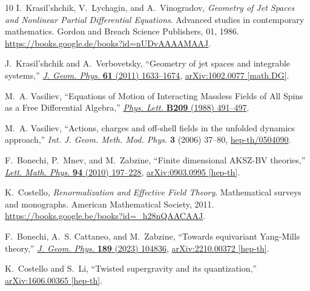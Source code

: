 \documentclass[a4paper,12pt]{article}
\numberwithin{equation}{section} %
\numberwithin{equation}{section}
\begin{document}
\begin{thebibliography}{10}
I.~Krasil'shchik, V.~Lychagin, and A.~Vinogradov, {\em Geometry of Jet Spaces and Nonlinear Partial Differential Equations}.
\newblock Advanced studies in contemporary mathematics. Gordon and Breach Science Publishers, 01, 1986.
\newblock \url{https://books.google.de/books?id=nUDvAAAAMAAJ}.

J.~Krasil'shchik and A.~Verbovetsky, ``{G}eometry of jet spaces and integrable systems,'' \href{http://dx.doi.org/10.1016/j.geomphys.2010.10.012}{{\em J. Geom. Phys.} {\bfseries 61} (2011) 1633--1674},
\href{http://arxiv.org/abs/1002.0077}{{\ttfamily arXiv:1002.0077 [math.DG]}}.

M.~A. Vasiliev, ``{Equations of Motion of Interacting Massless Fields of All Spins as a Free Differential Algebra},''
\href{http://dx.doi.org/10.1016/0370-2693(88)91179-3}{{\em Phys. Lett.} {\bfseries B209} (1988) 491--497}.

M.~A. Vasiliev, ``{A}ctions, charges and off-shell fields in the unfolded dynamics approach,'' {\em Int. J. Geom. Meth. Mod. Phys.} {\bfseries 3} (2006) 37--80,
\href{http://arxiv.org/abs/hep-th/0504090}{{\ttfamily hep-th/0504090}}.

F.~Bonechi, P.~Mnev, and M.~Zabzine, ``{F}inite dimensional {AKSZ}-{BV} theories,'' \href{http://dx.doi.org/10.1007/s11005-010-0423-3}{{\em Lett. Math. Phys.} {\bfseries 94} (2010) 197--228},
\href{http://arxiv.org/abs/0903.0995}{{\ttfamily arXiv:0903.0995 [hep-th]}}.

K.~Costello, {\em Renormalization and Effective Field Theory}.
\newblock Mathematical surveys and monographs. American Mathematical Society, 2011.
\newblock \url{https://books.google.be/books?id=_h28nQAACAAJ}.

F.~Bonechi, A.~S. Cattaneo, and M.~Zabzine, ``{Towards equivariant Yang-Mills theory},'' \href{http://dx.doi.org/10.1016/j.geomphys.2023.104836}{{\em J. Geom. Phys.} {\bfseries 189} (2023) 104836}, \href{http://arxiv.org/abs/2210.00372}{{\ttfamily arXiv:2210.00372 [hep-th]}}.

K.~Costello and S.~Li, ``{Twisted supergravity and its quantization},'' \href{http://arxiv.org/abs/1606.00365}{{\ttfamily arXiv:1606.00365 [hep-th]}}.


\end{thebibliography}
\end{document}

